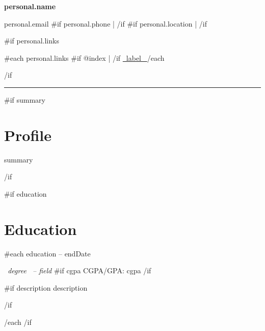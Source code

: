 \documentclass[10pt,a4paper]{article}
\begin{document}
\color{bodytext}

{\color{navy}\fontsize{25}{28}\selectfont
\bfseries {{personal.name}}
\par}

\vspace{3pt}

{\small\color{muted}
{{personal.email}}
{{#if personal.phone}}
\enspace | 
{{/if}}
{{#if personal.location}}
\enspace | 
{{/if}}
\par}

{{#if personal.links}}
\vspace{2pt}
{\small
{{#each personal.links}}
{{#if @index}}
\enspace | \enspace
{{/if}}
\href{ {{~url~}} }{ {{~label~}} }
{{/each}}
\par}
{{/if}}

\vspace{5pt}
{\color{accent}\rule{\textwidth}{2pt}}
\par
\vspace{1pt}

{{#if summary}}
\section{Profile}
{{summary}}
\par
{{/if}}

{{#if education}}
\section{Education}

{{#each education}}
\textbf{ }
\hfill
{\small{} -- {{endDate}} }
\par

\textit{ {{~degree~}} -- {{field}} }
{{#if cgpa}}
\hfill
{\small\color{muted}CGPA/GPA: {{cgpa}} }
{{/if}}
\par

{{#if description}}
{{description}}
\par
{{/if}}

\vspace{2pt}
{{/each}}
{{/if}}
\end{document}
